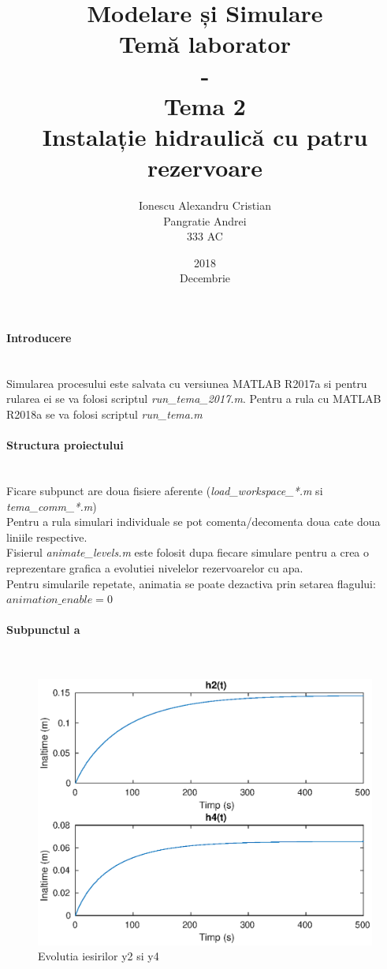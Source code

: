 \documentclass[12pt,english]{article}
\title{Modelare și Simulare\\Temă laborator\\-\\Tema 2\\Instalație hidraulică cu patru rezervoare}
\date{2018\\Decembrie}
\author{Ionescu Alexandru Cristian\\Pangratie Andrei\\333 AC}
\newcommand{\myparagraph}[1]{\paragraph{#1}\mbox{}\\}
\begin{document}
\maketitle

\pagebreak


\myparagraph {Introducere}
Simularea procesului este salvata cu versiunea MATLAB R2017a si pentru rularea ei se va folosi scriptul \textit{run\_tema\_2017.m}. Pentru a rula cu MATLAB R2018a se va folosi scriptul \textit{run\_tema.m}

\myparagraph {Structura proiectului}
Ficare subpunct are doua fisiere aferente (\textit{load\_workspace\_*.m} si \textit{tema\_comm\_*.m}) \\
Pentru a rula simulari individuale se pot comenta/decomenta doua cate doua liniile respective.\\
Fisierul \textit{animate\_levels.m} este folosit dupa fiecare simulare pentru a crea o reprezentare grafica a evolutiei nivelelor rezervoarelor cu apa.\\
Pentru simularile repetate, animatia se poate dezactiva prin setarea flagului: $animation\_enable = 0$

% 



\myparagraph {Subpunctul a}

\begin{figure} [H]
	\includegraphics[width=1\textwidth]{a_2.eps}
	\caption{Evolutia iesirilor y2 si y4}
\end{figure}
\end{document}
